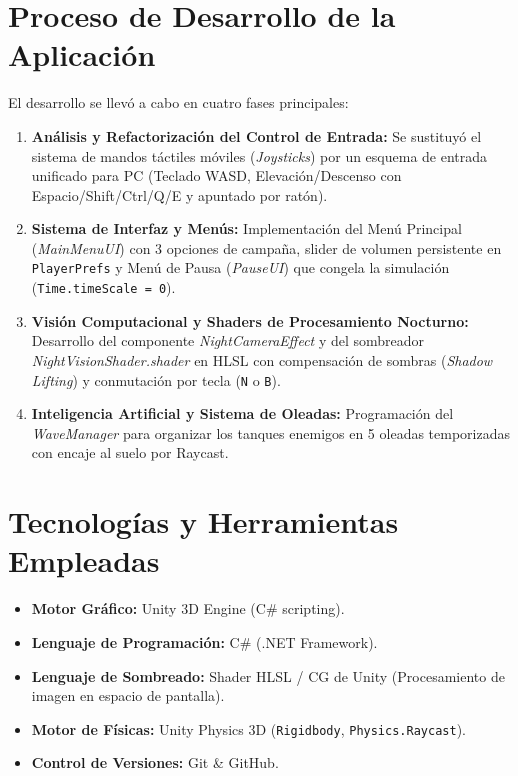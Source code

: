 \documentclass[12pt,a4paper]{article}
\begin{document}
\section{Proceso de Desarrollo de la Aplicación}

El desarrollo se llevó a cabo en cuatro fases principales:

\begin{enumerate}
    \item \textbf{Análisis y Refactorización del Control de Entrada:} Se sustituyó el sistema de mandos táctiles móviles (\textit{Joysticks}) por un esquema de entrada unificado para PC (Teclado WASD, Elevación/Descenso con Espacio/Shift/Ctrl/Q/E y apuntado por ratón).
    \item \textbf{Sistema de Interfaz y Menús:} Implementación del Menú Principal (\textit{MainMenuUI}) con 3 opciones de campaña, slider de volumen persistente en \texttt{PlayerPrefs} y Menú de Pausa (\textit{PauseUI}) que congela la simulación (\texttt{Time.timeScale = 0}).
    \item \textbf{Visión Computacional y Shaders de Procesamiento Nocturno:} Desarrollo del componente \textit{NightCameraEffect} y del sombreador \textit{NightVisionShader.shader} en HLSL con compensación de sombras (\textit{Shadow Lifting}) y conmutación por tecla (\texttt{N} o \texttt{B}).
    \item \textbf{Inteligencia Artificial y Sistema de Oleadas:} Programación del \textit{WaveManager} para organizar los tanques enemigos en 5 oleadas temporizadas con encaje al suelo por Raycast.
\end{enumerate}

\section{Tecnologías y Herramientas Empleadas}

\begin{itemize}
    \item \textbf{Motor Gráfico:} Unity 3D Engine (C\# scripting).
    \item \textbf{Lenguaje de Programación:} C\# (.NET Framework).
    \item \textbf{Lenguaje de Sombreado:} Shader HLSL / CG de Unity (Procesamiento de imagen en espacio de pantalla).
    \item \textbf{Motor de Físicas:} Unity Physics 3D (\texttt{Rigidbody}, \texttt{Physics.Raycast}).
    \item \textbf{Control de Versiones:} Git \& GitHub.
\end{itemize}
\end{document}
